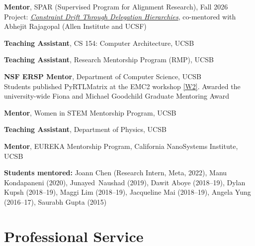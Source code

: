 \documentclass[11pt,letterpaper]{article}
\newcommand{\pref}[1]{\hyperlink{pub:#1}{[#1]}}
\begin{document}
\begin{yearlist}
\item[2026] \textbf{Mentor}, SPAR (Supervised Program for Alignment Research), Fall 2026 \\
  Project: \href{https://sparai.org/projects/f26/recIHq2myqMGSkiHs/}{\emph{Constraint Drift Through Delegation Hierarchies}}, co-mentored with Abhejit \mbox{Rajagopal} (Allen Institute and UCSF)
\item[2021] \textbf{Teaching Assistant}, CS 154: Computer Architecture, UCSB
\item[2019] \textbf{Teaching Assistant}, Research Mentorship Program (RMP), UCSB
\item[2018--19] \textbf{NSF ERSP Mentor}, Department of Computer Science, UCSB \\
  Students published PyRTLMatrix at the EMC2 workshop \pref{W2}. Awarded the university-wide Fiona and Michael Goodchild Graduate Mentoring Award
\item[2016--18] \textbf{Mentor}, Women in STEM Mentorship Program, UCSB
\item[2015] \textbf{Teaching Assistant}, Department of Physics, UCSB
\item[2015] \textbf{Mentor}, EUREKA Mentorship Program, California NanoSystems Institute, UCSB
\end{yearlist}

\textbf{Students mentored:} Joann Chen (Research Intern, Meta, 2022), Manu Kondapaneni (2020), \mbox{Junayed Naushad} (2019), Dawit Aboye (2018--19), Dylan Kupsh (2018--19), Maggi Lim (2018--19), Jacqueline Mai (2018--19), Angela Yung (2016--17), Saurabh Gupta (2015)

\section{Professional Service}
\end{document}

